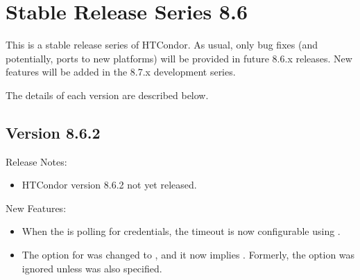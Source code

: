 
\section{\label{sec:History-8-6}Stable Release Series 8.6}

This is a stable release series of HTCondor.
As usual, only bug fixes (and potentially, ports to new platforms)
will be provided in future 8.6.x releases.
New features will be added in the 8.7.x development series.

The details of each version are described below.

\subsection*{\label{sec:New-8-6-2}Version 8.6.2}

\noindent Release Notes:

\begin{itemize}

\item HTCondor version 8.6.2 not yet released.

\end{itemize}


\noindent New Features:

\begin{itemize}

\item When the  is polling for credentials, the timeout is now
configurable using .

\item The  option for  was changed to ,
and it now implies .  Formerly, the  option was ignored
unless  was also specified.

\end{itemize}

